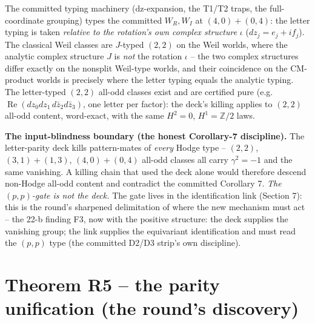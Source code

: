 \documentclass[11pt]{article}
\newcommand{\Z}{\mathbb Z}
\begin{document}
The committed typing machinery (dz-expansion, the T1/T2 traps, the
full-coordinate grouping) types the committed $W_R,W_I$ at
$(4,0)+(0,4)$: the letter typing is taken \emph{relative to the
rotation's own complex structure} $\iota$ ($dz_j=e_j+i f_j$). The
classical Weil classes are $J$-typed $(2,2)$ on the Weil worlds, where
the analytic complex structure $J$ is \emph{not} the rotation $\iota$
-- the two complex structures differ exactly on the nonsplit Weil-type
worlds, and their coincidence on the CM-product worlds is precisely
where the letter typing equals the analytic typing. The letter-typed
$(2,2)$ all-odd classes exist and are certified pure (e.g.\
$\operatorname{Re}(dz_0dz_1\,d\bar z_2d\bar z_3)$, one letter per
factor): the deck's killing applies to $(2,2)$ all-odd content,
word-exact, with the same $H^2=0$, $H^1=\Z/2$ laws.

\textbf{The input-blindness boundary (the honest Corollary-7
discipline).} The letter-parity deck kills pattern-mates of
\emph{every} Hodge type -- $(2,2)$, $(3,1)+(1,3)$, $(4,0)+(0,4)$
all-odd classes all carry $\gamma^2=-1$ and the same vanishing. A
killing chain that used the deck alone would therefore descend
non-Hodge all-odd content and contradict the committed Corollary 7.
\emph{The $(p,p)$-gate is not the deck.} The gate lives in the
identification link (Section 7): this is the round's sharpened
delimitation of where the new mechanism must act -- the 22-b finding
F3, now with the positive structure: the deck supplies the vanishing
group; the link supplies the equivariant identification and must read
the $(p,p)$ type (the committed D2/D3 strip's own discipline).

\section{Theorem R5 -- the parity unification (the round's discovery)}
\end{document}
